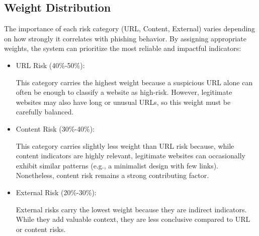 \documentclass[11pt]{article}
\begin{document}
\subsection{Weight Distribution}

The importance of each risk category (URL, Content, External) varies depending on how strongly it correlates with phishing behavior. By assigning appropriate weights, the system can prioritize the most reliable and impactful indicators:

\begin{itemize}
    \item URL Risk (40\%-50\%):
    
    This category carries the highest weight because a suspicious URL alone can often be enough to classify a website as high-risk. However, legitimate websites may also have long or unusual URLs, so this weight must be carefully balanced.

    \item Content Risk (30\%-40\%):
    
    This category carries slightly less weight than URL risk because, while content indicators are highly relevant, legitimate websites can occasionally exhibit similar patterns (e.g., a minimalist design with few links). Nonetheless, content risk remains a strong contributing factor.

    \item External Risk (20\%-30\%):
    
    External risks carry the lowest weight because they are indirect indicators. While they add valuable context, they are less conclusive compared to URL or content risks.

\end{itemize}
\end{document}
